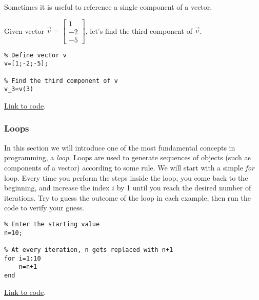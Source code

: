 \documentclass{ximera}
\begin{document}
Sometimes it is useful to reference a single component of a vector.
\begin{template}\label{temp:vectorComp}
    Given vector $\vec{v}=\begin{bmatrix}1\\-2\\-5\end{bmatrix}$, let's find the third component of $\vec{v}$.
\begin{verbatim}
% Define vector v
v=[1;-2;-5];

% Find the third component of v
v_3=v(3)
\end{verbatim}

    \href{https://sagecell.sagemath.org/?z=eJxTVXBJTcvMS1UoS00uyS9SKOPlKrONNrTWNbLWNY215uXi5VJVcMvMS1EoyUgF4syiFIXk_NyC_LzUvBKF_DSwhnhj2zINY00AVTYWYw==&lang=octave&interacts=eJyLjgUAARUAuQ==}{Link to code}.
\end{template}

\subsubsection*{Loops}
In this section we will introduce one of the most fundamental concepts in programming, a \emph{loop}.  Loops are used to generate sequences of objects (such as components of a vector) according to some rule.  We will start with a simple \emph{for} loop.  Every time you perform the steps inside the loop, you come back to the beginning, and increase the index $i$ by 1 until you reach the desired number of iterations.  Try to guess the outcome of the loop in each example, then run the code to verify your guess.

\begin{example}\label{ex:loop1}
        \begin{verbatim}
% Enter the starting value
n=10;

% At every iteration, n gets replaced with n+1
for i=1:10
    n=n+1
end
    \end{verbatim}

\href{https://sagecell.sagemath.org/?z=eJwdyjEOglAQRdF-ktnDa6iw4LeSX1i4kB95wiRkMMOIcfcSb3lyO9w9GciF2LNFms842vqmitcyjCoqHW4JHowv7Jxb2uYXOGbmjuBrbQ9O-Fgu8L6oPLeA1XItgwrOvP6ZPv0AoF8hKw==&lang=octave&interacts=eJyLjgUAARUAuQ==}{Link to code}.    
\end{example}
\end{document}
